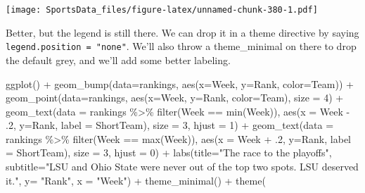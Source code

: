 \documentclass[
]{book}
\newenvironment{Shaded}{\begin{snugshade}}{\end{snugshade}}
\newcommand{\AttributeTok}[1]{\textcolor[rgb]{0.77,0.63,0.00}{#1}}
\newcommand{\DecValTok}[1]{\textcolor[rgb]{0.00,0.00,0.81}{#1}}
\newcommand{\FunctionTok}[1]{\textcolor[rgb]{0.00,0.00,0.00}{#1}}
\newcommand{\NormalTok}[1]{#1}
\newcommand{\SpecialCharTok}[1]{\textcolor[rgb]{0.00,0.00,0.00}{#1}}
\newcommand{\StringTok}[1]{\textcolor[rgb]{0.31,0.60,0.02}{#1}}
\begin{document}
\texttt{[image: SportsData\_files/figure-latex/unnamed-chunk-380-1.pdf]}

Better, but the legend is still there. We can drop it in a theme directive by saying \texttt{legend.position\ =\ "none"}. We'll also throw a theme\_minimal on there to drop the default grey, and we'll add some better labeling.

\begin{Shaded}
\begin{Highlighting}[]
\FunctionTok{ggplot}\NormalTok{() }\SpecialCharTok{+} 
  \FunctionTok{geom\_bump}\NormalTok{(}\AttributeTok{data=}\NormalTok{rankings, }\FunctionTok{aes}\NormalTok{(}\AttributeTok{x=}\NormalTok{Week, }\AttributeTok{y=}\NormalTok{Rank, }\AttributeTok{color=}\NormalTok{Team)) }\SpecialCharTok{+} 
  \FunctionTok{geom\_point}\NormalTok{(}\AttributeTok{data=}\NormalTok{rankings, }\FunctionTok{aes}\NormalTok{(}\AttributeTok{x=}\NormalTok{Week, }\AttributeTok{y=}\NormalTok{Rank, }\AttributeTok{color=}\NormalTok{Team), }\AttributeTok{size =} \DecValTok{4}\NormalTok{) }\SpecialCharTok{+}   
  \FunctionTok{geom\_text}\NormalTok{(}\AttributeTok{data =}\NormalTok{ rankings }\SpecialCharTok{\%\textgreater{}\%} \FunctionTok{filter}\NormalTok{(Week }\SpecialCharTok{==} \FunctionTok{min}\NormalTok{(Week)), }\FunctionTok{aes}\NormalTok{(}\AttributeTok{x =}\NormalTok{ Week }\SpecialCharTok{{-}}\NormalTok{ .}\DecValTok{2}\NormalTok{, }\AttributeTok{y=}\NormalTok{Rank, }\AttributeTok{label =}\NormalTok{ ShortTeam), }\AttributeTok{size =} \DecValTok{3}\NormalTok{, }\AttributeTok{hjust =} \DecValTok{1}\NormalTok{) }\SpecialCharTok{+}
  \FunctionTok{geom\_text}\NormalTok{(}\AttributeTok{data =}\NormalTok{ rankings }\SpecialCharTok{\%\textgreater{}\%} \FunctionTok{filter}\NormalTok{(Week }\SpecialCharTok{==} \FunctionTok{max}\NormalTok{(Week)), }\FunctionTok{aes}\NormalTok{(}\AttributeTok{x =}\NormalTok{ Week }\SpecialCharTok{+}\NormalTok{ .}\DecValTok{2}\NormalTok{, }\AttributeTok{y=}\NormalTok{Rank, }\AttributeTok{label =}\NormalTok{ ShortTeam), }\AttributeTok{size =} \DecValTok{3}\NormalTok{, }\AttributeTok{hjust =} \DecValTok{0}\NormalTok{) }\SpecialCharTok{+}
  \FunctionTok{labs}\NormalTok{(}\AttributeTok{title=}\StringTok{"The race to the playoffs"}\NormalTok{, }\AttributeTok{subtitle=}\StringTok{"LSU and Ohio State were never out of the top two spots. LSU deserved it."}\NormalTok{, }\AttributeTok{y=} \StringTok{"Rank"}\NormalTok{, }\AttributeTok{x =} \StringTok{"Week"}\NormalTok{) }\SpecialCharTok{+}
  \FunctionTok{theme\_minimal}\NormalTok{() }\SpecialCharTok{+}
  \FunctionTok{theme}\NormalTok{(}

\end{Highlighting}
\end{Shaded}
\end{document}
